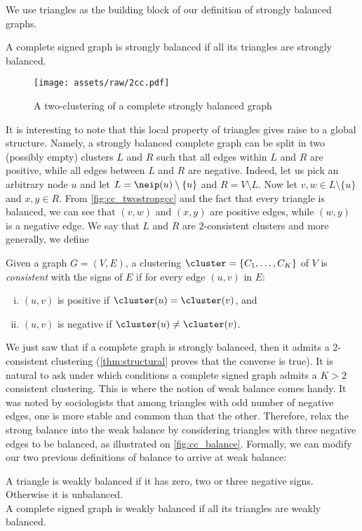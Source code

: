 We use triangles as the building block of our definition of strongly balanced graphs.
\begin{definition}
	A complete signed graph is strongly balanced if all its triangles are strongly balanced.
\end{definition}

\begin{wrapfigure}{o}[10mm]{45mm}
  \centering
  \texttt{[image: assets/raw/2cc.pdf]}
  \caption{\small A two-clustering of a complete strongly balanced graph}
  \label{fig:cc_twostrongcc}
\end{wrapfigure}
It is interesting to note that this local property of triangles gives raise to a global structure.
Namely, a strongly balanced complete graph can be split in two (possibly empty) clusters $L$ and $R$
such that all edges within $L$ and $R$ are positive, while all edges between $L$ and $R$ are
negative. Indeed, let us pick an arbitrary node $u$ and let $L=\neip(u)\setminus \{u\}$ and $R=V\setminus L$. Now
let $v,w\in L\setminus \{u\}$ and $x,y\in R$. From \autoref{fig:cc_twostrongcc} and the fact that
every triangle is balanced, we can see that $(v,w)$ and $(x,y)$ are positive edges, while $(w,y)$ is
a negative edge.
We say that $L$ and $R$ are $2$-consistent clusters and more generally, we define
\begin{definition}
  Given a graph $G=(V, E)$, a clustering $\cluster=\{C_1, \ldots, C_K\}$ of $V$ is \emph{consistent}
  with the signs of $E$ if for every edge $(u,v)$ in $E$:
  \begin{enumerate}[(i),nosep]
    \item $(u,v)$ is positive if $\cluster(u)=\cluster(v)$, and
    \item $(u,v)$ is negative if $\cluster(u)\neq\cluster(v)$.
  \end{enumerate}
\end{definition}

We just saw that if a complete graph is strongly balanced, then it admits a $2$-consistent
clustering (\autoref{thm:structural} proves that the converse is true). It is natural to ask under which
conditions a complete signed graph admits a $K>2$ consistent clustering. This is where the notion of
weak balance comes handy. It was noted by
sociologists that among triangles with odd number of negative edges, one is more stable and common
than that the other. Therefore, \textcite{davis1967clustering} relax the strong balance into the
weak balance by considering triangles with three negative edges to be balanced, as illustrated on
\autoref{fig:cc_balance}. Formally, we can modify our two previous definitions of balance to arrive
at weak balance:
\begin{definition}\label{def:weak_balance}
	A triangle is weakly balanced if it has zero, two or three negative signs. Otherwise it is
	unbalanced. \\
	A complete signed graph is weakly balanced if all its triangles are weakly balanced.
\end{definition}

